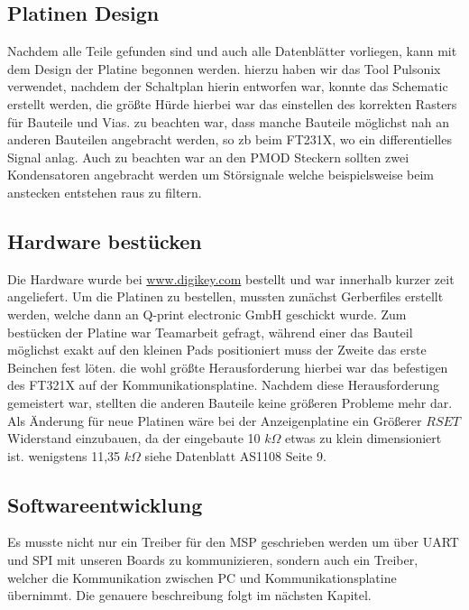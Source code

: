 \subsection{Platinen Design}
Nachdem alle Teile gefunden sind und auch alle Datenblätter vorliegen, kann mit dem Design der Platine begonnen werden.
hierzu haben wir das Tool Pulsonix verwendet, nachdem der Schaltplan hierin entworfen war, konnte das Schematic erstellt werden, die größte Hürde hierbei war das einstellen des korrekten Rasters für Bauteile und Vias.
zu beachten war, dass manche Bauteile möglichst nah an anderen Bauteilen angebracht werden, so zb beim FT231X, wo ein differentielles Signal anlag.
Auch zu beachten war an den PMOD Steckern sollten zwei Kondensatoren angebracht werden um Störsignale welche beispielsweise beim anstecken entstehen raus zu filtern.

\subsection{Hardware bestücken}
Die Hardware wurde bei \url{www.digikey.com} bestellt und war innerhalb kurzer zeit angeliefert. Um die Platinen zu bestellen, mussten zunächst Gerberfiles erstellt werden, welche dann an Q-print electronic GmbH geschickt wurde.
Zum bestücken der Platine war Teamarbeit gefragt, während einer das Bauteil möglichst exakt auf den kleinen Pads positioniert muss der Zweite das erste Beinchen fest löten. die wohl größte Herausforderung hierbei war das befestigen des FT321X auf der Kommunikationsplatine. Nachdem diese Herausforderung gemeistert war, stellten die anderen Bauteile keine größeren Probleme mehr dar.
Als Änderung für neue Platinen wäre bei der Anzeigenplatine ein Größerer $RSET$ Widerstand einzubauen, da der eingebaute 10 $k\Omega$ etwas zu klein dimensioniert ist. wenigstens 11,35 $k\Omega$ siehe Datenblatt AS1108 Seite 9.

\subsection{Softwareentwicklung}
Es musste nicht nur ein Treiber für den MSP geschrieben werden um über UART und SPI mit unseren Boards zu kommunizieren, sondern auch ein Treiber, welcher die Kommunikation zwischen PC und Kommunikationsplatine übernimmt. Die genauere beschreibung folgt im nächsten Kapitel.

